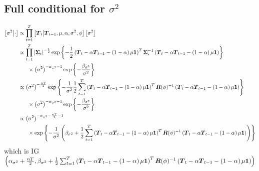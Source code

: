 \documentclass{article}\usepackage[]{graphicx}\usepackage[]{color}
\def\bm#1{\mbox{\boldmath $#1$}}
\begin{document}
\subsection{Full conditional for $\sigma^2$}
%
\begin{align*}
%
\left[ \sigma^2 \middle| \cdot \right] & \propto \prod_{t = 1}^T \left[ \bm{T}_t \middle| \bm{T}_{t - 1}, \mu, \alpha, \sigma^2, \phi \right] \left[ \sigma^2 \right]\\
%
& \propto \prod_{t = 1}^T \left| \bm{\Sigma}_\epsilon \right|^{ - \frac{1} {2} } \exp{ \left\{ - \frac{1} {2} \left( \bm{T}_t  - \alpha \bm{T}_{t - 1} - \left( 1 - \alpha \right) \mu \bm{1} \right)^T \bm{\Sigma}_\epsilon^{ - 1} \left( \bm{T}_t  - \alpha \bm{T}_{t - 1} - \left( 1 - \alpha \right) \mu \bm{1} \right) \right\} }\\
& \hspace{6mm} \times \left( \sigma^2 \right)^{ - \alpha_{\sigma^2} - 1} \exp{ \left\{ - \frac{\beta_{\sigma^2}} {\sigma^2} \right\} } \\
%
& \propto \left( \sigma^2 \right)^{ - \frac{n T} {2} } \exp{ \left\{ - \frac{1} {\sigma^2} \frac{1} {2} \sum_{t = 1}^T \left( \bm{T}_t  - \alpha \bm{T}_{t - 1} - \left( 1 - \alpha \right) \mu \bm{1} \right)^T \bm{R}(\phi)^{ - 1} \left( \bm{T}_t  - \alpha \bm{T}_{t - 1} - \left( 1 - \alpha \right) \mu \bm{1} \right) \right\} }\\
& \hspace{6mm} \times \left( \sigma^2 \right)^{ - \alpha_{\sigma^2} - 1} \exp{ \left\{ - \frac{\beta_{\sigma^2}} {\sigma^2} \right\} } \\
%
& \propto \left( \sigma^2 \right)^{ - \alpha_{\sigma^2} - \frac{n T} {2} - 1}\\
& \hspace{6mm} \times \exp{ \left\{ - \frac{1} {\sigma^2} \left( \beta_{\sigma^2} + \frac{1} {2} \sum_{t = 1}^T \left( \bm{T}_t  - \alpha \bm{T}_{t - 1} - \left( 1 - \alpha \right) \mu \bm{1} \right)^T \bm{R}(\phi)^{ - 1} \left( \bm{T}_t  - \alpha \bm{T}_{t - 1} - \left( 1 - \alpha \right) \mu \bm{1} \right) \right) \right\} }\\
%
\end{align*}
%
which is IG$\left( \alpha_{\sigma^2} + \frac{n T} {2}, \beta_{\sigma^2} + \frac{1} {2} \sum_{t = 1}^T \left( \bm{T}_t  - \alpha \bm{T}_{t - 1} - \left( 1 - \alpha \right) \mu \bm{1} \right)^T \bm{R}(\phi)^{ - 1} \left( \bm{T}_t  - \alpha \bm{T}_{t - 1} - \left( 1 - \alpha \right) \mu \bm{1} \right) \right)$
%
%
\end{document}
